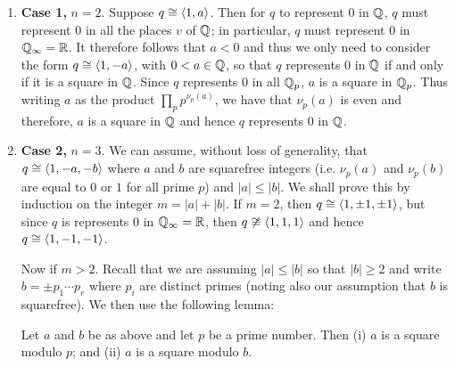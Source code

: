 \begin{enumerate}[wide, nosep, label=(\alph*)]
    \item \textbf{Case 1,} \(n = 2\). Suppose \(q \cong \langle 1, a \rangle\). Then
    for \(q\) to represent \(0\) in \(\mathbb{Q}\), \(q\) must represent \(0\)
    in all the places \(v\) of \(\mathbb{Q}\); in particular, \(q\) must
    represent \(0\) in \(\mathbb{Q}_{\infty} = \mathbb{R}\). It therefore follows
    that \(a < 0\) and thus we only need to consider the form \(q \cong
    \langle 1, -a \rangle\), with \(0 < a \in \mathbb{Q}\), so that \(q\) represents
    \(0\) in \(\mathbb{Q}\) if and only if it is a square in \(\mathbb{Q}\).
    Since \(q\) represents \(0\) in all \(\mathbb{Q}_p\),  \(a\) is a square in
    \(\mathbb{Q}_p\). Thus writing \(a\) as the product \(\prod_p
    p^{\nu_p(a)}\), we have that \(\nu_p(a)\) is even and therefore, \(a\) is a
    square in \(\mathbb{Q}\) and hence \(q\) represents \(0\) in \(\mathbb{Q}\).
    
    \item \textbf{Case 2,} \(n = 3\). We can assume, without loss of generality,
    that \(q \cong \langle 1, -a, -b \rangle\) where \(a\) and \(b\) are squarefree
    integers (i.e. \(\nu_p(a)\) and \(\nu_p(b)\) are equal to \(0\) or \(1\) for
    all prime \(p\)) and \(|a| \leq |b|\). We shall prove this by induction on
    the integer \(m = |a| + |b|\). If \(m = 2\), then \(q \cong \langle 1, \pm
    1, \pm 1 \rangle\), but since \(q\) is represents 0 in \(\mathbb{Q}_\infty =
    \mathbb{R}\), then \(q \not\cong \langle 1, 1, 1 \rangle\) and hence \(q \cong
    \langle 1, -1, -1 \rangle\).
    
    Now if \(m > 2\). Recall that we are assuming \(|a| \leq |b|\) so that \(|b|
    \geq 2\) and write \(b = \pm p_1 \cdots p_r\) where \(p_i\) are distinct
    primes (noting also our assumption that \(b\) is squarefree). We then use
    the following lemma:

    \begin{lemma}
        Let \(a\) and \(b\) be as above and let \(p\) be a prime number. Then
        {\normalfont (i)} \(a\) is a square modulo \(p\); and {\normalfont (ii)}
        \(a\) is a square modulo \(b\).
    \end{lemma}


\end{enumerate}
